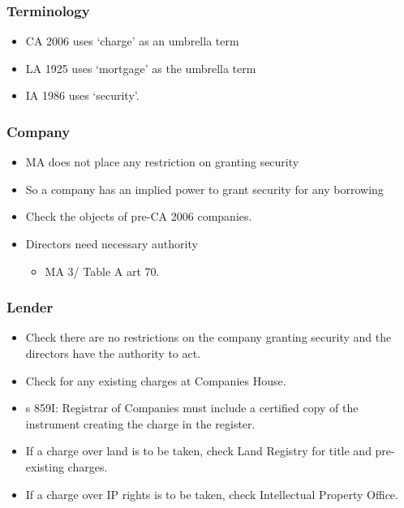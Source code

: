 \documentclass[
]{article}
\providecommand{\tightlist}{%
  \setlength{\itemsep}{0pt}\setlength{\parskip}{0pt}}
\begin{document}
\hypertarget{terminology}{%
\subsubsection{Terminology}\label{terminology}}

\begin{itemize}
\tightlist
\item
  CA 2006 uses `charge' as an umbrella term
\item
  LA 1925 uses `mortgage' as the umbrella term
\item
  IA 1986 uses `security'.
\end{itemize}

\hypertarget{company}{%
\subsubsection{Company}\label{company}}

\begin{itemize}
\tightlist
\item
  MA does not place any restriction on granting security
\item
  So a company has an implied power to grant security for any borrowing
\item
  Check the objects of pre-CA 2006 companies.
\item
  Directors need necessary authority

  \begin{itemize}
  \tightlist
  \item
    MA 3/ Table A art 70.
  \end{itemize}
\end{itemize}

\hypertarget{lender}{%
\subsubsection{Lender}\label{lender}}

\begin{itemize}
\tightlist
\item
  Check there are no restrictions on the company granting security and
  the directors have the authority to act.
\item
  Check for any existing charges at Companies House.
\item
  s 859I: Registrar of Companies must include a certified copy of the
  instrument creating the charge in the register.
\item
  If a charge over land is to be taken, check Land Registry for title
  and pre-existing charges.
\item
  If a charge over IP rights is to be taken, check Intellectual Property
  Office.
\end{itemize}
\end{document}
